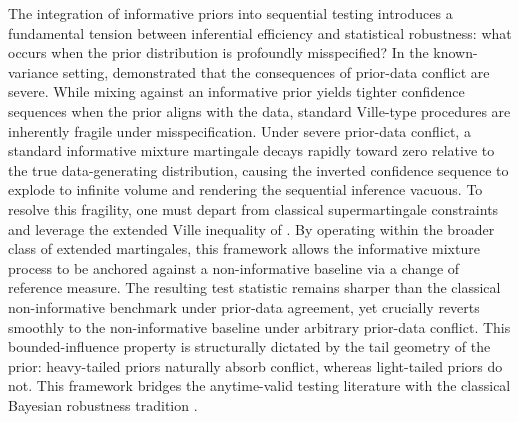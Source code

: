 \documentclass[numsec,webpdf,modern,medium,namedate]{oup-authoring-template}
\theoremstyle{thmstyleone}%
\theoremstyle{thmstyletwo}%
\theoremstyle{thmstylethree}%
\newcommand{\1}{\mathbf{1}}
\begin{document}
The integration of informative priors into sequential testing introduces a fundamental tension between inferential efficiency and statistical robustness: what occurs when the prior distribution is profoundly misspecified? In the known-variance setting, \cite{Cortinovis2025} demonstrated that the 
consequences of prior-data conflict are severe. While mixing against an informative prior yields tighter confidence sequences when the prior aligns with the data, standard Ville-type procedures are inherently fragile under misspecification. Under severe prior-data conflict, a standard informative 
mixture martingale decays rapidly toward zero relative to the true data-generating distribution, causing the inverted confidence sequence to explode to infinite volume and rendering the sequential inference vacuous. To resolve this fragility, 
one must depart from classical supermartingale constraints and leverage the extended Ville inequality of \cite{wang2025extended}. By operating within the broader class of extended martingales, this framework allows the informative mixture process to be anchored against a non-informative baseline via a change of reference measure. The resulting test statistic remains sharper than the classical non-informative benchmark under prior-data agreement, yet crucially reverts smoothly to the non-informative baseline under arbitrary 
prior-data conflict. This bounded-influence property is structurally dictated by the tail geometry of the prior: heavy-tailed priors naturally absorb conflict, whereas light-tailed priors do not. This framework bridges the anytime-valid testing literature with the classical Bayesian robustness 
tradition \citep{Dawid1973, Berger1980, PericchiSmith1992, PericchiSanso1995}.

\end{document}
